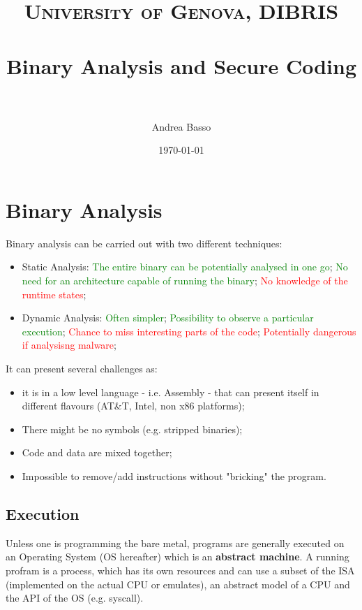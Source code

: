 \documentclass[paper=a4, fontsize=11pt]{report} %
\title{	
\normalfont \normalsize 
\textsc{University of Genova, DIBRIS} \\ [25pt]
\horrule{0.5pt} \\[0.4cm] %
\huge Binary Analysis and Secure Coding \\
\horrule{2pt} \\[0.5cm] %
}
\author{Andrea Basso} %
\date{\normalsize\today} %
\numberwithin{equation}{section} %
\numberwithin{figure}{section} %
\numberwithin{table}{section} %
\begin{document}
\maketitle %
\tableofcontents
\chapter{Binary Analysis}
Binary analysis can be carried out with two different techniques:
\begin{itemize}
	\item Static Analysis:
		\subitem \textcolor{green}{The entire binary can be potentially 
		analysed in one go};
		\subitem \textcolor{green}{No need for an architecture capable of 
		running the binary};
		\subitem \textcolor{red}{No knowledge of the runtime states};
	\item Dynamic Analysis:
		\subitem \textcolor{green}{Often simpler};
		\subitem \textcolor{green}{Possibility to observe a particular 
		execution};
		\subitem \textcolor{red}{Chance to miss interesting parts of the code};
		\subitem \textcolor{red}{Potentially dangerous if analysisng malware};
\end{itemize}
It can present several challenges as:
\begin{itemize}
	\item it is in a low level language - i.e. Assembly - that can present 
	itself in different flavours (AT\&T, Intel, non x86 platforms);
	\item There might be no symbols (e.g. stripped binaries);
	\item Code and data are mixed together;
	\item Impossible to remove/add instructions without "bricking" the program.
\end{itemize}

\section{Execution}
Unless one is programming the bare metal, programs are generally executed on an 
Operating System (OS hereafter) which is an \textbf{abstract machine}.
A running profram is a process, which has its own resources and can use a 
subset of the ISA (implemented on the actual CPU or emulates), an abstract 
model of a CPU and the API of the OS (e.g. syscall).
\end{document}
